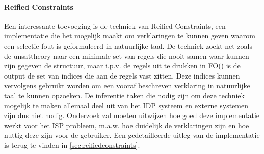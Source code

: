 \paragraph{Reified Constraints}
Een interessante toevoeging is de techniek van Reified Constraints, een implementatie die het mogelijk maakt om verklaringen te kunnen geven waarom een selectie fout is geformuleerd in natuurlijke taal. De techniek zoekt net zoals de unsattheory naar een minimale set van regels die nooit samen waar kunnen zijn gegeven de structuur, maar i.p.v. de regels uit te drukken in FO(\textperiodcentered) is de output de set van indices die aan de regels vast zitten. Deze indices kunnen vervolgens gebruikt worden om een vooraf beschreven verklaring in natuurlijke taal te kunnen opzoeken. De inferentie taken die nodig zijn om deze techniek mogelijk te maken allemaal deel uit van het IDP systeem en externe systemen zijn dus niet nodig. Onderzoek zal moeten uitwijzen hoe goed deze implementatie werkt voor het ISP probleem, m.a.w. hoe duidelijk de verklaringen zijn en hoe nuttig deze zijn voor de gebruiker. Een gedetailleerde uitleg van de implementatie is terug te vinden in \ref{sec:reifiedconstraints}.

